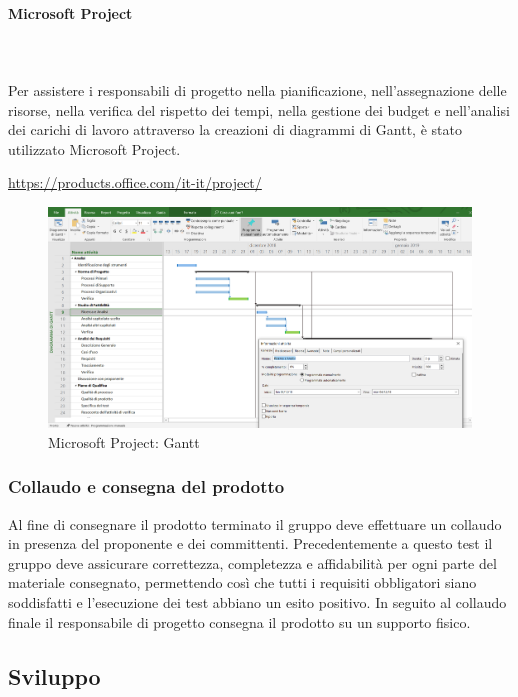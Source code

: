 \paragraph{Microsoft Project} \mbox{}\\ \mbox{}\\
Per assistere i responsabili di progetto nella pianificazione, 
nell'assegnazione delle risorse, nella verifica del rispetto dei tempi, nella 
gestione dei budget e nell'analisi dei carichi di lavoro attraverso la creazioni 
di diagrammi di Gantt\glo, è stato utilizzato Microsoft Project. \\
		\centerline{\url{https://products.office.com/it-it/project/}}
	\begin{figure}[H]
		\includegraphics[width=0.99\linewidth]{res/images/projectS.png}
		\caption{Microsoft Project: Gantt}
	\end{figure}
	 

		
\subsubsection{Collaudo e consegna del prodotto}
Al fine di consegnare il prodotto terminato il gruppo deve effettuare un 
collaudo in presenza del proponente e dei committenti. Precedentemente a questo 
test il gruppo deve assicurare correttezza, completezza e affidabilità per ogni 
parte del materiale consegnato, permettendo così che tutti i requisiti 
obbligatori siano soddisfatti e l'esecuzione dei test abbiano un esito positivo. 
In seguito al collaudo finale il responsabile di progetto consegna il prodotto 
su un supporto fisico.
		
     
\subsection{Sviluppo}

